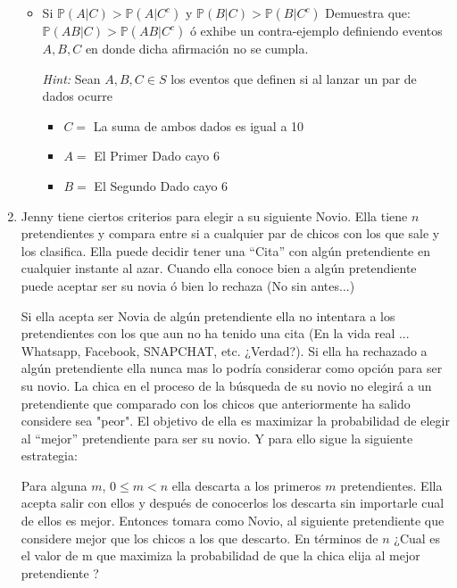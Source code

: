 \documentclass[11pt,letterpaper]{report}
\newcommand{\Pro}{\mathds{P}}
\begin{document}
\begin{enumerate}
\begin{itemize}
    \item Si $\Pro(A|C) > \Pro(A|C^c)$ y $\Pro(B|C)>\Pro(B|C^c)$
    Demuestra que: $\Pro(AB|C) > \Pro(AB|C^c)$ ó exhibe un contra-ejemplo definiendo eventos 
    $A, B, C$ en donde dicha afirmación no se cumpla.

    \textit{Hint:} Sean $A, B, C \in S$ los eventos que definen si al lanzar un par de dados ocurre
    \begin{itemize}
        \item $C =$ {La suma de ambos dados es igual a 10}
        \item $A =$ {El Primer Dado cayo 6}
        \item $B =$ {El Segundo Dado cayo 6}
    \end{itemize}

\end{itemize}

\item Jenny tiene ciertos criterios para elegir a su siguiente Novio. Ella tiene $n$ pretendientes
y compara entre si a cualquier par de chicos con los que sale y los clasifica. Ella puede decidir
tener una ``Cita'' con algún pretendiente en cualquier instante al azar. Cuando ella conoce bien a
algún pretendiente puede aceptar ser su novia ó bien lo rechaza (No sin antes...)

Si ella acepta ser Novia de algún pretendiente ella no intentara a los pretendientes con los que
aun no ha tenido una cita (En la vida real ... Whatsapp, Facebook, SNAPCHAT, etc. ¿Verdad?). Si ella
ha rechazado a algún pretendiente ella nunca mas lo podría considerar como opción para ser su novio.
La chica en el proceso de la búsqueda de su novio no elegirá a un pretendiente que comparado con los
chicos que anteriormente ha salido considere sea "peor". El objetivo de ella es maximizar la
probabilidad de elegir al ``mejor'' pretendiente para ser su novio. Y para ello sigue la siguiente
estrategia:

Para alguna $m$, $0 \leq m < n$ ella descarta a los primeros $m$ pretendientes. Ella acepta salir
con ellos y después de conocerlos los descarta sin importarle cual de ellos es mejor. Entonces
tomara como Novio, al siguiente pretendiente que considere mejor que los chicos a los que descarto.
En términos de $n$ ¿Cual es el valor de m que maximiza la probabilidad de que la chica elija al
mejor pretendiente ?


\end{enumerate}
\end{document}
